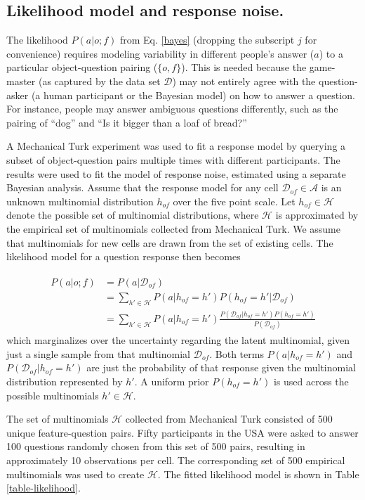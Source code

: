 \documentclass[11pt,letterpaper]{article}
\newcommand{\mc}[1]{\mathcal{#1}}
\begin{document}
\subsection*{Likelihood model and response noise.}
The likelihood $P(a | o; f)$ from Eq. \ref{bayes} (dropping the subscript $j$ for convenience) requires modeling variability in different people's answer ($a$) to a particular object-question pairing ($\{o, f\}$). 
This is needed because the game-master (as captured by the data set $\mc{D}$) may not entirely agree with the question-asker (a human participant or the Bayesian model) on how to answer a question. 
For instance, people may answer ambiguous questions differently, such as the pairing of ``dog'' and ``Is it bigger than a loaf of bread?'' 

A Mechanical Turk experiment was used to fit a response model by querying a subset of object-question pairs multiple times with different participants. 
The results were used to fit the model of response noise, estimated using a separate Bayesian analysis. 
Assume that the response model for any cell $\mc{D}_{of} \in \mc{A}$ is an unknown multinomial distribution $h_{of}$ over the five point scale. 
Let $h_{of} \in \mc{H}$ denote the possible set of multinomial distributions, where $\mc{H}$ is approximated by the empirical set of multinomials collected from Mechanical Turk. 
We assume that multinomials for new cells are drawn from the set of existing cells. 
The likelihood model for a question response then becomes

\begin{align*}
\begin{split}
P(a | o; f) & = P(a|\mc{D}_{of}) \\
& = \sum_{h' \in \mc{H}} P(a|h_{of}=h') P(h_{of}=h'|\mc{D}_{of}) \\
& = \sum_{h' \in \mc{H}} P(a|h_{of}=h') \frac{P(\mc{D}_{of}|h_{of}=h')P(h_{of}=h')}{P(\mc{D}_{of})}
\end{split}
\end{align*}
which marginalizes over the uncertainty regarding the latent multinomial, given just a single sample from that multinomial $\mc{D}_{of}$. 
Both terms $P(a|h_{of}=h')$ and $P(\mc{D}_{of}|h_{of}=h')$ are just the probability of that response given the multinomial distribution represented by $h'$. 
A uniform prior $P(h_{of}=h')$ is used across the possible multinomials $h' \in \mc{H}$.

The set of multinomials $\mc{H}$ collected from Mechanical Turk consisted of 500 unique feature-question pairs. 
Fifty participants in the USA were asked to answer 100 questions randomly chosen from this set of 500 pairs, resulting in approximately 10 observations per cell.
The corresponding set of 500 empirical multinomials was used to create $\mc{H}$.
The fitted likelihood model is shown in Table \ref{table-likelihood}.
\end{document}
